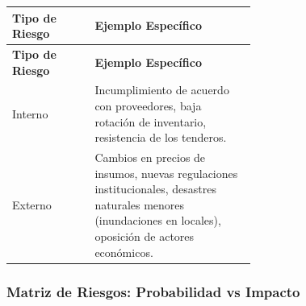 \documentclass[letterpaper, 11pt]{report}
\begin{document}
\begin{longtable}{|p{0.2\linewidth}|p{0.4\linewidth}|}
\hline
\textbf{Tipo de Riesgo} & \textbf{Ejemplo Específico} \\
\hline
\endfirsthead

\hline
\textbf{Tipo de Riesgo} & \textbf{Ejemplo Específico} \\
\hline
\endhead

\hline
\endfoot

\hline
\endlastfoot

Interno & Incumplimiento de acuerdo con proveedores, baja rotación de inventario, resistencia de los tenderos. \\
\hline
Externo & Cambios en precios de insumos, nuevas regulaciones institucionales, desastres naturales menores (inundaciones en locales), oposición de actores económicos. \\
\hline

\end{longtable}

\subsubsection{Matriz de Riesgos: Probabilidad vs Impacto}
\end{document}
